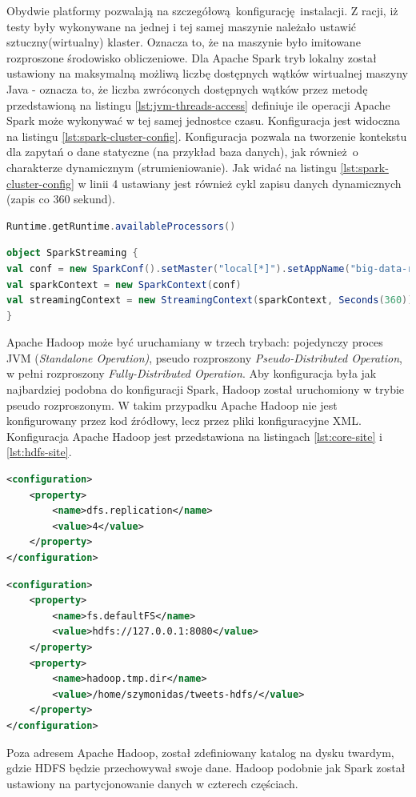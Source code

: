 Obydwie platformy pozwalają na szczegółową konfigurację instalacji. Z racji, iż testy były wykonywane na jednej i tej samej maszynie należało ustawić sztuczny(wirtualny) klaster. Oznacza to, że na maszynie było imitowane rozproszone środowisko obliczeniowe. Dla Apache Spark tryb lokalny został ustawiony na maksymalną możliwą liczbę dostępnych wątków wirtualnej maszyny Java - oznacza to, że liczba zwróconych dostępnych wątków przez metodę przedstawioną na listingu \ref{lst:jvm-threads-access} definiuje ile operacji Apache Spark może wykonywać w tej samej jednostce czasu. Konfiguracja jest widoczna na listingu \ref{lst:spark-cluster-config}. Konfiguracja pozwala na tworzenie kontekstu dla zapytań o dane statyczne (na przykład baza danych), jak również o charakterze dynamicznym (strumieniowanie). Jak widać na listingu \ref{lst:spark-cluster-config} w linii 4 ustawiany jest również cykl zapisu danych dynamicznych (zapis co 360 sekund).
\begin{lstlisting}[language=scala, caption={Metoda zwracająca liczbę dostępnych wątków wirtualnej maszyny Java},captionpos=b, label={lst:jvm-threads-access}]
Runtime.getRuntime.availableProcessors() 
\end{lstlisting}
\begin{lstlisting}[language=scala, caption={Konfigracja klastra dla Apache Spark},captionpos=b, label={lst:spark-cluster-config}]
object SparkStreaming {
val conf = new SparkConf().setMaster("local[*]").setAppName("big-data-runner-spark-driver-application")
val sparkContext = new SparkContext(conf)
val streamingContext = new StreamingContext(sparkContext, Seconds(360))
}
\end{lstlisting} 
Apache Hadoop może być uruchamiany w trzech trybach: pojedynczy proces JVM (\textit{Standalone Operation)}, pseudo rozproszony \textit{Pseudo-Distributed Operation}, w pełni rozproszony \textit{Fully-Distributed Operation}. Aby konfiguracja była jak najbardziej podobna do konfiguracji Spark, Hadoop został uruchomiony w trybie pseudo rozproszonym. W takim przypadku Apache Hadoop nie jest konfigurowany przez kod źródłowy, lecz przez pliki konfiguracyjne XML. Konfiguracja Apache Hadoop jest przedstawiona na listingach \ref{lst:core-site} i \ref{lst:hdfs-site}.
\begin{lstlisting}[language=XML, label={lst:hdfs-site},captionpos=b, caption={Konfigracja Apache Hadoop dla trybu pseudo rozproszonego. Plik hdfs-site.xml}]
<configuration>
	<property>
		<name>dfs.replication</name>
		<value>4</value>
	</property>
</configuration>
\end{lstlisting}
\begin{lstlisting}[language=XML, label={lst:core-site}, captionpos=b, caption={Konfigracja Apache Hadoop dla trybu pseudo rozproszonego. Plik core-site.xml}, float]
<configuration>
	<property>
		<name>fs.defaultFS</name>
		<value>hdfs://127.0.0.1:8080</value>
	</property>
	<property>
		<name>hadoop.tmp.dir</name>
		<value>/home/szymonidas/tweets-hdfs/</value>
	</property>
</configuration>
\end{lstlisting}
Poza adresem Apache Hadoop, został zdefiniowany katalog na dysku twardym, gdzie HDFS będzie przechowywał swoje dane. Hadoop podobnie jak Spark został ustawiony na partycjonowanie danych w czterech częściach.
